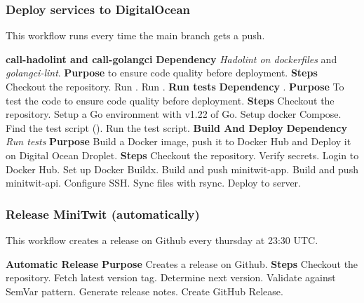 \subsubsection{Deploy services to DigitalOcean}
This workflow runs every time the main branch gets a push.
\begin{outline}[enumerate]
    \1 \textbf{call-hadolint and call-golangci}
        \2 \textbf{Dependency}
            \3 \textit{Hadolint on dockerfiles} and \textit{golangci-lint}.
        \2 \textbf{Purpose} 
            \3 to ensure code quality before deployment.
        \2 \textbf{Steps}
            \3 Checkout the repository.
            \3 Run .
            \3 Run .
    \1 \textbf{Run tests}
        \2 \textbf{Dependency}
            \3 .
        \2 \textbf{Purpose}
            \3 To test the code to ensure code quality before deployment.
        \2 \textbf{Steps}
            \3 Checkout the repository.
            \3 Setup a Go environment with v1.22 of Go.
            \3 Setup docker Compose.
            \3 Find the test script ().
            \3 Run the test script.
    \1 \textbf{Build And Deploy}
        \2 \textbf{Dependency}
            \3 \textit{Run tests}
        \2 \textbf{Purpose}
            \3 Build a Docker image, push it to Docker Hub and Deploy it on Digital Ocean Droplet.
        \2 \textbf{Steps}
            \3 Checkout the repository.
            \3 Verify secrets.
            \3 Login to Docker Hub.
            \3 Set up Docker Buildx.
            \3 Build and push minitwit-app.
            \3 Build and push minitwit-api.
            \3 Configure SSH.
            \3 Sync files with rsync.
            \3 Deploy to server.
\end{outline}

\subsubsection{Release MiniTwit (automatically)}
This workflow creates a release on Github every thursday at 23:30 UTC.
\begin{outline}
    \1 \textbf{Automatic Release}
        \2 \textbf{Purpose} 
            \3 Creates a release on Github.
        \2 \textbf{Steps}
            \3 Checkout the repository.
            \3 Fetch latest version tag.
            \3 Determine next version.
            \3 Validate against SemVar pattern.
            \3 Generate release notes.
            \3 Create GitHub Release.
\end{outline}